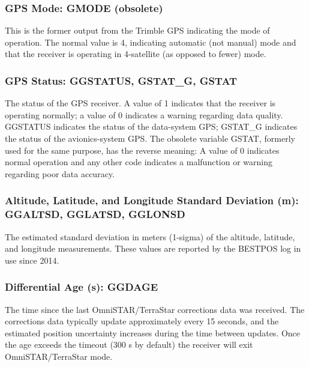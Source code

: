 \documentclass[
  english,
]{book}
\begin{document}
\hypertarget{gmode}{%
\subsubsection*{GPS Mode: GMODE (obsolete)}\label{gmode}}

This is the former output from the Trimble GPS indicating the mode of
operation. The normal value is 4, indicating automatic (not manual) mode
and that the receiver is operating in 4-satellite (as opposed to fewer)
mode.

\hypertarget{ggstatus}{%
\subsubsection*{GPS Status: GGSTATUS, GSTAT\_G, GSTAT}\label{ggstatus}}

The status of the GPS receiver. A value of 1 indicates that the receiver
is operating normally; a value of 0 indicates a warning regarding data
quality. GGSTATUS indicates the status of the data-system GPS; GSTAT\_G
indicates the status of the avionics-system GPS. The obsolete variable
GSTAT, formerly used for the same purpose, has the reverse meaning: A
value of 0 indicates normal operation and any other code indicates a
malfunction or warning regarding poor data accuracy.

\hypertarget{altitude-latitude-and-longitude-standard-deviation-m-ggaltsd-gglatsd-gglonsd}{%
\subsubsection{Altitude, Latitude, and Longitude Standard Deviation (m):
GGALTSD, GGLATSD,
GGLONSD}\label{altitude-latitude-and-longitude-standard-deviation-m-ggaltsd-gglatsd-gglonsd}}

The estimated standard deviation in meters (1-sigma) of the altitude,
latitude, and longitude measurements. These values are reported by the
BESTPOS log in use since 2014.

\hypertarget{differential-age-s-ggdage}{%
\subsubsection{Differential Age (s):
GGDAGE}\label{differential-age-s-ggdage}}

The time since the last OmniSTAR/TerraStar corrections data was
received. The corrections data typically update approximately every 15
seconds, and the estimated position uncertainty increases during the
time between updates. Once the age exceeds the timeout (300 s by
default) the receiver will exit OmniSTAR/TerraStar mode.
\end{document}
